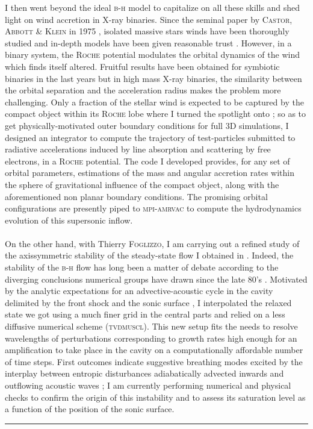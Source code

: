 \documentclass[a4paper,12pt,onecolumn]{article}
\begin{document}
\indent I then went beyond the ideal \textsc{b-h} model to capitalize on all these skills and shed light on wind accretion in X-ray binaries. Since the seminal paper by \textsc{Castor, Abbott \& Klein} in 1975 \citep{Castor1975}, isolated massive stars winds have been thoroughly studied and in-depth models have been given reasonable trust \citep{Lamers1999}. However, in a binary system, the \textsc{Roche} potential modulates the orbital dynamics of the wind which finds itself altered. Fruitful results have been obtained for symbiotic binaries in the last years \cite{deValBorro:2009gk} but in high mass X-ray binaries, the similarity between the orbital separation and the acceleration radius makes the problem more challenging. Only a fraction of the stellar wind is expected to be captured by the compact object within its \textsc{Roche} lobe where I turned the spotlight onto ; so as to get physically-motivated outer boundary conditions for full 3D simulations, I designed an integrator to compute the trajectory of test-particles submitted to radiative accelerations induced by line absorption and scattering by free electrons, in a \textsc{Roche} potential. The code I developed provides, for any set of orbital parameters, estimations of the mass and angular accretion rates within the sphere of gravitational influence of the compact object, along with the aforementioned non planar boundary conditions. The promising orbital configurations are presently piped to \textsc{mpi-amrvac} to compute the hydrodynamics evolution of this supersonic inflow.\\
\\
\newpage
\indent On the other hand, with Thierry \textsc{Foglizzo}, I am carrying out a refined study of the axissymmetric stability of the steady-state flow I obtained in \cite{ElMellah2015}. Indeed, the stability of the \textsc{b-h} flow has long been a matter of debate according to the diverging conclusions numerical groups have drawn since the late 80's \cite{Foglizzo2005}. Motivated by the analytic expectations for an advective-acoustic cycle in the cavity delimited by the front shock and the sonic surface \citep{Foglizzo2009}, I interpolated the relaxed state we got using a much finer grid in the central parts and relied on a less diffusive numerical scheme (\textsc{tvdmuscl}). This new setup fits the needs to resolve wavelengths of perturbations corresponding to growth rates high enough for an amplification to take place in the cavity on a computationally affordable number of time steps. First outcomes indicate suggestive breathing modes excited by the interplay between entropic disturbances adiabatically advected inwards and outflowing acoustic waves ; I am currently performing numerical and physical checks to confirm the origin of this instability and to assess its saturation level as a function of the position of the sonic surface.\\
\begin{center}
\rule{0.25\textwidth}{1pt}
\end{center}
~\\
\end{document}
